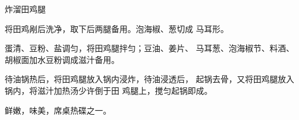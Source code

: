 \begin{recipe}{炸溜田鸡腿}

\ingredients


\cooking

\step 将田鸡剐后洗净，取下后两腿备用。泡海椒、葱切成 马耳形。

\step 蛋清、豆粉、盐调匀，将田鸡腿拌匀；豆油、姜片、 马耳葱、泡海椒节、料酒、胡椒面加水豆粉调成滋汁备用。

待油锅热后，将田鸡腿放入锅内浸炸，待油浸透后， 起锅去骨，又将田鸡腿放入锅内，将滋汁加热汤少许倒于田 鸡腿上，搅匀起锅即成。

\notes

鲜嫩，味美，席桌热碟之一。

\end{recipe}

